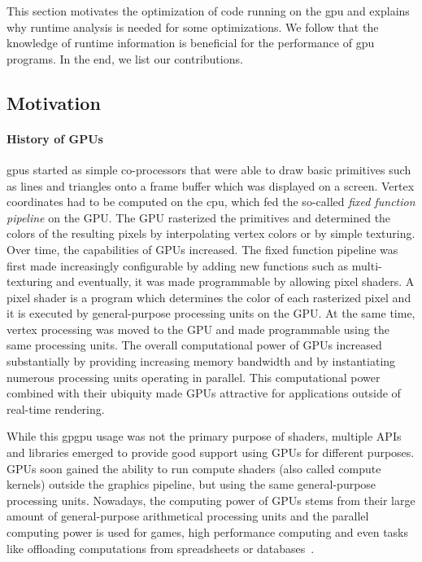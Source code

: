 {}
This section motivates the optimization of code running on the \gls{gpu} and explains why runtime analysis is needed for some optimizations.
We follow that the knowledge of runtime information is beneficial for the performance of \gls{gpu} programs. In the end, we list our contributions.

\subsection{Motivation}
\label{sub:motivation}
\paragraph{History of GPUs} \Glspl{gpu} started as simple co-processors that were able to draw basic primitives such as lines and triangles onto a frame buffer which was displayed on a screen.
Vertex coordinates had to be computed on the \gls{cpu}, which fed the so-called \emph{fixed function pipeline} on the GPU.
The GPU rasterized the primitives and determined the colors of the resulting pixels by interpolating vertex colors or by simple texturing.
Over time, the capabilities of GPUs increased. The fixed function pipeline was first made increasingly configurable by adding new functions such as multi-texturing and eventually, it was made programmable by allowing pixel shaders.
A pixel shader is a program which determines the color of each rasterized pixel and it is executed by general-purpose processing units on the GPU.
At the same time, vertex processing was moved to the GPU and made programmable using the same processing units.
The overall computational power of GPUs increased substantially by providing increasing memory bandwidth and by instantiating numerous processing units operating in parallel.
This computational power combined with their ubiquity made GPUs attractive for applications outside of real-time rendering.~\cite{McClanahan2010}

While this \gls{gpgpu} usage was not the primary purpose of shaders, multiple APIs and libraries emerged to provide good support using GPUs for different purposes.
GPUs soon gained the ability to run compute shaders (also called compute kernels) outside the graphics pipeline, but using the same general-purpose processing units.
Nowadays, the computing power of GPUs stems from their large amount of general-purpose arithmetical processing units and the parallel computing power is used for games, high performance computing and even tasks like offloading computations from spreadsheets or databases~\cite{Lillqvist2016, Meraji2015}.

